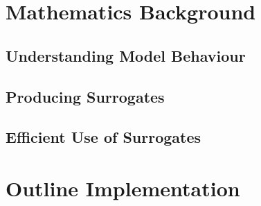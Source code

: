\section{Mathematics Background}\label{sec:maths}
\subsection{Understanding Model Behaviour}\label{sec:stage1}

\subsection{Producing Surrogates}\label{sec:stage2}

\subsection{Efficient Use of Surrogates}\label{sec:stage3}

\clearpage
\section{Outline Implementation}\label{sec:impl}

